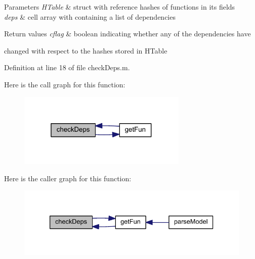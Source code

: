 \begin{DoxyParams}{Parameters}
{\em H\+Table} & struct with reference hashes of functions in its fields\\
\hline
{\em deps} & cell array with containing a list of dependencies\\
\hline
\end{DoxyParams}

\begin{DoxyRetVals}{Return values}
{\em cflag} & boolean indicating whether any of the dependencies have\\
\hline
\end{DoxyRetVals}
changed with respect to the hashes stored in H\+Table 

Definition at line 18 of file check\+Deps.\+m.



Here is the call graph for this function\+:\nopagebreak
\begin{figure}[H]
\begin{center}
\leavevmode
\includegraphics[width=229pt]{classamimodel_aa04dcfc1d2188cae948a75ebd46a6e03_cgraph}
\end{center}
\end{figure}




Here is the caller graph for this function\+:\nopagebreak
\begin{figure}[H]
\begin{center}
\leavevmode
\includegraphics[width=333pt]{classamimodel_aa04dcfc1d2188cae948a75ebd46a6e03_icgraph}
\end{center}
\end{figure}


\hypertarget{classamimodel_ab21f46296b0ee0a141c38143a79ad396}{}
